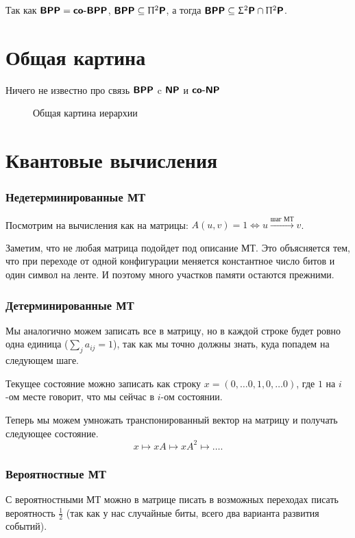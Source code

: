 \begin{note}
	Так как $ \textmd{\textbf{\textsf{BPP}}} = \textmd{\textbf{\textsf{co-BPP}}}$, $ \textmd{\textbf{\textsf{BPP}}} \subseteq \Uppi^2\textmd{\textbf{\textsf{P}}}$, а тогда $ \textmd{\textbf{\textsf{BPP}}} \subseteq \Upsigma^2\textmd{\textbf{\textsf{P}}} \cap \Uppi^2\textmd{\textbf{\textsf{P}}}$.
\end{note}


\section{Общая картина}

Ничего не известно про связь $\textmd{\textbf{\textsf{BPP}}}$ c $\textmd{\textbf{\textsf{NP}}}$ и $\textmd{\textbf{\textsf{co-NP}}}$

\begin{figure}[ht]
    \centering
    \caption{Общая картина иерархии}
    \label{fig:general-picture}
\end{figure}

\section{Квантовые вычисления}
\subsubsection{Недетерминированные МТ}
Посмотрим на вычисления как на матрицы: $ A(u, v) = 1 \Longleftrightarrow u \stackrel{\text{шаг МТ}}{\longrightarrow} v$.

Заметим, что не любая матрица подойдет под описание МТ. Это объясняется тем, что при переходе от одной конфигурации меняется константное число битов и один символ на ленте. И поэтому много участков памяти остаются прежними.

\subsubsection{Детерминированные МТ}
Мы аналогично можем записать все в матрицу, но в каждой строке будет ровно одна единица ($ \sum_{j}^{} a_{ij} = 1$), так как мы точно должны знать, куда попадем на следующем шаге.

Текущее состояние можно записать как строку $ x = (0, \ldots 0, 1, 0, \ldots 0)$, где $ 1$ на $ i$-ом месте говорит, что мы сейчас в $ i$-ом состоянии.

Теперь мы можем умножать транспонированный вектор на матрицу и получать следующее состояние.
\[
x \longmapsto xA \longmapsto xA^2 \longmapsto \ldots 
.\] 

\subsubsection{Вероятностные МТ}
С вероятностными МТ можно в матрице писать в возможных переходах писать вероятность $ \tfrac{1}{2}$ (так как у нас случайные биты, всего два варианта развития событий).

